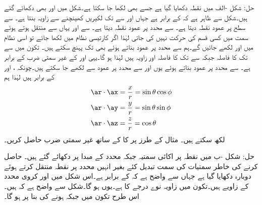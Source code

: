 حل: شکل -الف میں نقطہ  دکھایا گیا ہے جسے  بھی لکھا جا سکتا ہے۔شکل میں  اور  بھی دکھائے گئے ہیں۔شکل سے ظاہر ہے کہ  کے برابر ہے جہاں  اور  سے  تک لکیریں کھینچنے سے زاویہ  بنتا ہے۔ سے  سطح پر عمود نقطہ  دیتا ہے۔ سے  محدد پر عمود نقطہ  دیتا ہے۔ سے  اور یہاں سے  منتقل ہوتے ہوئے  سمت میں کسی قسم کی حرکت نہیں کی جاتی لہٰذا اگر کارتیسی نظام میں  لکھا جائے تو اسی نظام میں  اور   لکھے جائیں گے۔ہم  سے  محدد پر عمود بناتے ہوئے بھی  تک پہنچ سکتے ہیں۔ تکون  میں  سے  تک کا فاصلہ  جبکہ  سے  تک کا فاصلہ  اور زاویہ  ہیں لہٰذا  ہو گا۔یہی   اور  کے غیر سمتی ضرب  کے برابر ہے۔ سے  محدد پر عمود بناتے ہوئے یوں  اور  سے  محدد پر عمود سے  لکھے جا سکتے ہیں۔چونکہ ،  اور  کے برابر  ہیں لہٰذا ہم
\begin{align*}
\ar \cdot \ax&=\frac{x}{r}=\sin \theta \cos \phi\\
\ar \cdot \ay&=\frac{y}{r}=\sin \theta \sin \phi\\
\ar \cdot \az&=\frac{z}{r}=\cos \theta
\end{align*}
لکھ سکتے ہیں۔
مثال  کے طرز پر   کا  کے ساتھ غیر سمتی ضرب حاصل کریں۔

حل: شکل -ب میں نقطہ  پر اکائی سمتیہ  جبکہ محدد کے مبدا  پر  دکھائے گئے ہیں۔ حاصل کرنے کی خاطر سمتیات کی سمت تبدیل کئے بغیر انہیں  محدد پر نقطہ  منتقل کرتے ہوئے دوبارہ دکھایا گیا ہے جہاں سے واضح ہے کہ  کے برابر ہے۔اس شکل میں  اور  کروی محدد کے زاویے ہیں۔تکون  میں زاویہ  نوے درجے کا ہے۔یوں  ہو گا۔شکل سے واضح ہے کہ   ہیں۔اس طرح تکون  میں  جبکہ  ہونے کی بنا پر  ہو گا۔

